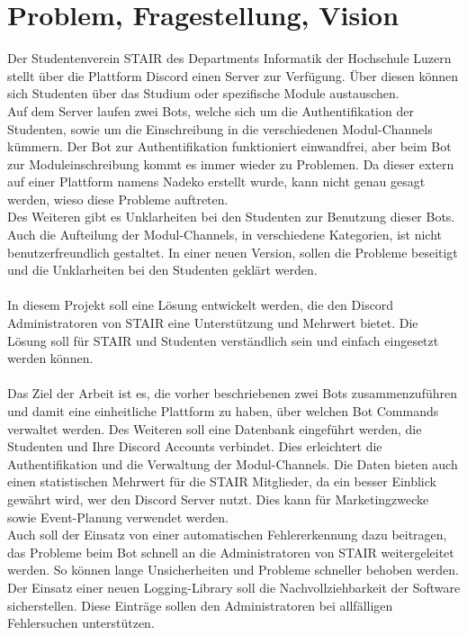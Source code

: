 \documentclass[a4paper, table]{article}
\begin{document}
\section{Problem, Fragestellung, Vision}
Der Studentenverein STAIR des Departments Informatik der Hochschule Luzern stellt über die Plattform Discord einen Server zur Verfügung.
Über diesen können sich Studenten über das Studium oder spezifische Module austauschen.\\
Auf dem Server laufen zwei Bots, welche sich um die Authentifikation der Studenten, sowie um die Einschreibung in die verschiedenen Modul-Channels kümmern.
Der Bot zur Authentifikation funktioniert einwandfrei, aber beim Bot zur Moduleinschreibung kommt es immer wieder zu Problemen.
Da dieser extern auf einer Plattform namens Nadeko erstellt wurde, kann nicht genau gesagt werden, wieso diese Probleme auftreten.\\
Des Weiteren gibt es Unklarheiten bei den Studenten zur Benutzung dieser Bots.
Auch die Aufteilung der Modul-Channels, in verschiedene Kategorien, ist nicht benutzerfreundlich gestaltet.
In einer neuen Version, sollen die Probleme beseitigt und die Unklarheiten bei den Studenten geklärt werden.\\\\
In diesem Projekt soll eine Lösung entwickelt werden, die den Discord Administratoren von STAIR eine Unterstützung und Mehrwert bietet.
Die Lösung soll für STAIR und Studenten verständlich sein und einfach eingesetzt werden können.\\\\
Das Ziel der Arbeit ist es, die vorher beschriebenen zwei Bots zusammenzuführen und damit eine einheitliche Plattform zu haben, über welchen Bot Commands verwaltet werden.
Des Weiteren soll eine Datenbank eingeführt werden, die Studenten und Ihre Discord Accounts verbindet.
Dies erleichtert die Authentifikation und die Verwaltung der Modul-Channels.
Die Daten bieten auch einen statistischen Mehrwert für die STAIR Mitglieder, da ein besser Einblick gewährt wird, wer den Discord Server nutzt.
Dies kann für Marketingzwecke sowie Event-Planung verwendet werden.\\
Auch soll der Einsatz von einer automatischen Fehlererkennung dazu beitragen, das Probleme beim Bot schnell an die Administratoren von STAIR weitergeleitet werden.
So können lange Unsicherheiten und Probleme schneller behoben werden.
Der Einsatz einer neuen Logging-Library soll die Nachvollziehbarkeit der Software sicherstellen.
Diese Einträge sollen den Administratoren bei allfälligen Fehlersuchen unterstützen.\\\\ 
\end{document}
